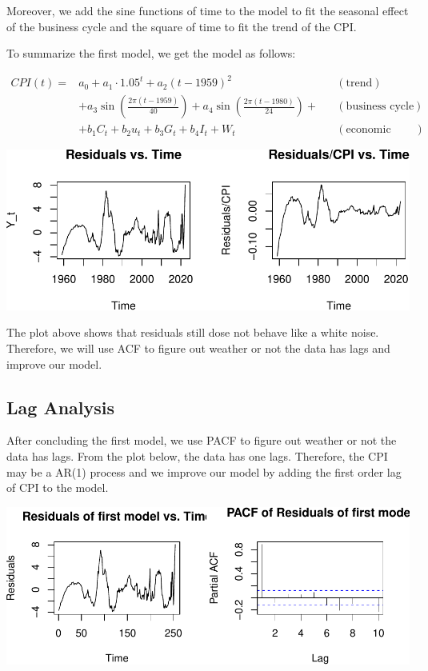 \documentclass[
  man,floatsintext,
  man]{apa6}
\begin{document}
Moreover, we add the sine functions of time to the model to fit the seasonal effect of the business cycle and the square of time to fit the trend of the CPI.

To summarize the first model, we get the model as follows:

\begin{align*}
CPI(t) =& a_0 + a_1 \cdot 1.05^t  + a_2 (t-1959)^2 && (\text{trend})\\
& + a_3 \sin\left(\frac{2\pi(t-1959)}{40}\right) + a_4 \sin\left(\frac{2\pi(t-1980)}{24}\right) + && (\text{business cycle})\\
& + b_1 C_t + b_2 u_t + b_3 G_t + b_4 I_t + W_t && (\text{economic variables})
\end{align*}

\includegraphics{stat429_group2_final_proj_files/figure-latex/unnamed-chunk-3-1.pdf}

The plot above shows that residuals still dose not behave like a white noise.
Therefore, we will use ACF to figure out weather or not the data has lags and improve our model.

\subsection{Lag Analysis}\label{lag-analysis}

After concluding the first model, we use PACF to figure out weather or not the data has lags.
From the plot below, the data has one lags.
Therefore, the CPI may be a AR(1) process
and we improve our model by adding the first order lag of CPI to the model.

\includegraphics{stat429_group2_final_proj_files/figure-latex/unnamed-chunk-4-1.pdf}
\end{document}
